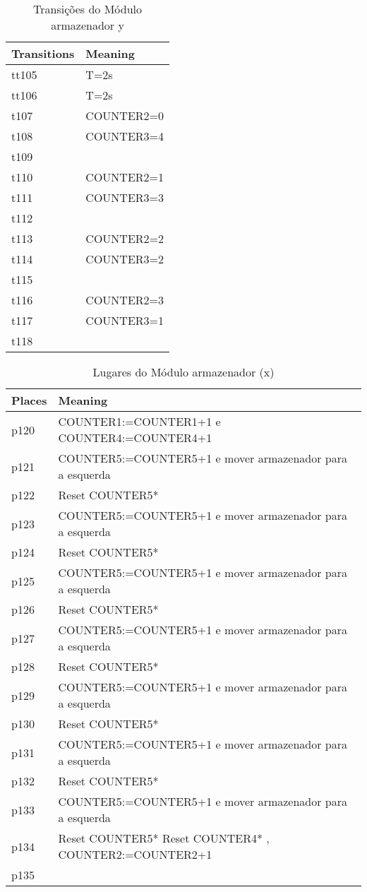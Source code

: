 \begin{table}[htbp]
\caption{Transições do Módulo armazenador y}
\centering
\begin{tabular}{ll}
Transitions & Meaning\\
\hline
tt105 & T=2s\\
tt106 & T=2s\\
t107 & COUNTER2=0\\
t108 & COUNTER3=4\\
t109 & \\
t110 & COUNTER2=1\\
t111 & COUNTER3=3\\
t112 & \\
t113 & COUNTER2=2\\
t114 & COUNTER3=2\\
t115 & \\
t116 & COUNTER2=3\\
t117 & COUNTER3=1\\
t118 & \\
\end{tabular}
\end{table}
\begin{table}[htbp]
\caption{Lugares do Módulo armazenador (x)}
\centering
\begin{tabular}{ll}
Places & Meaning\\
\hline
p120 & COUNTER1:=COUNTER1+1 e COUNTER4:=COUNTER4+1\\
p121 & COUNTER5:=COUNTER5+1 e mover armazenador para a esquerda\\
p122 & Reset COUNTER5*\\
p123 & COUNTER5:=COUNTER5+1 e mover armazenador para a esquerda\\
p124 & Reset COUNTER5*\\
p125 & COUNTER5:=COUNTER5+1 e mover armazenador para a esquerda\\
p126 & Reset COUNTER5*\\
p127 & COUNTER5:=COUNTER5+1 e mover armazenador para a esquerda\\
p128 & Reset COUNTER5*\\
p129 & COUNTER5:=COUNTER5+1 e mover armazenador para a esquerda\\
p130 & Reset COUNTER5*\\
p131 & COUNTER5:=COUNTER5+1 e mover armazenador para a esquerda\\
p132 & Reset COUNTER5*\\
p133 & COUNTER5:=COUNTER5+1 e mover armazenador para a esquerda\\
p134 & Reset COUNTER5* Reset COUNTER4* , COUNTER2:=COUNTER2+1\\
p135 & \\
\end{tabular}
\end{table}

